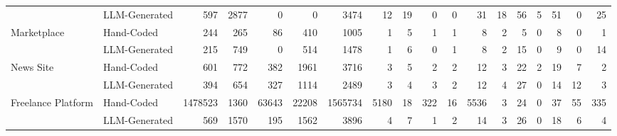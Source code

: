 \begin{table}[htbp]
\begin{tabular}{llrrrrrrrrrrrrrrrr}
 & LLM-Generated & 597 & 2877 & 0 & 0 & 3474 & 12 & 19 & 0 & 0 & 31 & 18 & 56 & 5 & 51 & 0 & 25 \\
\cline{1-18}
\multirow[t]{2}{*}{Marketplace} & Hand-Coded & 244 & 265 & 86 & 410 & 1005 & 1 & 5 & 1 & 1 & 8 & 2 & 5 & 0 & 8 & 0 & 1 \\
 & LLM-Generated & 215 & 749 & 0 & 514 & 1478 & 1 & 6 & 0 & 1 & 8 & 2 & 15 & 0 & 9 & 0 & 14 \\
\cline{1-18}
\multirow[t]{2}{*}{News Site} & Hand-Coded & 601 & 772 & 382 & 1961 & 3716 & 3 & 5 & 2 & 2 & 12 & 3 & 22 & 2 & 19 & 7 & 2 \\
 & LLM-Generated & 394 & 654 & 327 & 1114 & 2489 & 3 & 4 & 3 & 2 & 12 & 4 & 27 & 0 & 14 & 12 & 3 \\
\cline{1-18}
\multirow[t]{2}{*}{Freelance Platform} & Hand-Coded & 1478523 & 1360 & 63643 & 22208 & 1565734 & 5180 & 18 & 322 & 16 & 5536 & 3 & 24 & 0 & 37 & 55 & 335 \\
 & LLM-Generated & 569 & 1570 & 195 & 1562 & 3896 & 4 & 7 & 1 & 2 & 14 & 3 & 26 & 0 & 18 & 6 & 4 \\
\cline{1-18}
\bottomrule
\end{tabular}
\end{table}
